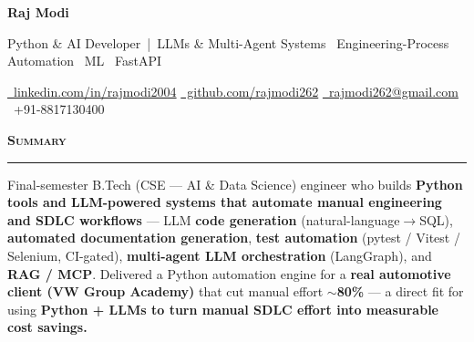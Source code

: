 \documentclass[a4paper,10pt]{article}
\newcommand{\sectionHeader}[2]{%
  \vspace{1.5pt}%
  \noindent%
  {\normalsize\bfseries\color{HeaderDark}#2\enspace\textsc{#1}}%
  \\[-6pt]%
  {\color{SectionLine}\rule{\textwidth}{1pt}}%
  \vspace{1pt}\par%
}
\begin{document}

\begin{center}
  {\fontsize{24}{28}\selectfont\bfseries\color{HeaderDark}Raj Modi}

  \vspace{2pt}

  {\small\color{MidGray}Python \& AI Developer \,|\, LLMs \& Multi-Agent Systems \textperiodcentered\ Engineering-Process Automation \textperiodcentered\ ML \textperiodcentered\ FastAPI}

  \vspace{3pt}

  {\small%
    \href{https://www.linkedin.com/in/rajmodi2004/}{{\color{AccentBlue}\faLinkedin}~\color{LinkBlue}linkedin.com/in/rajmodi2004}%
    \quad{\color{LightGray}|}%
    \quad\href{https://github.com/rajmodi262}{{\color{AccentBlue}\faGithub}~\color{LinkBlue}github.com/rajmodi262}%
    \quad{\color{LightGray}|}%
    \quad\href{mailto:rajmodi262@gmail.com}{{\color{AccentBlue}\faEnvelope}~\color{LinkBlue}rajmodi262@gmail.com}%
    \quad{\color{LightGray}|}%
    \quad{\color{AccentBlue}\faPhone*}~{\color{DarkGray}+91-8817130400}%
  }
\end{center}

\vspace{-2pt}


\sectionHeader{Summary}{\faUser}

\vspace{1pt}
{\small Final-semester B.Tech (CSE --- AI \& Data Science) engineer who builds \textbf{Python tools and LLM-powered systems that automate manual engineering and SDLC workflows} --- LLM \textbf{code generation} (natural-language$\rightarrow$SQL), \textbf{automated documentation generation}, \textbf{test automation} (pytest / Vitest / Selenium, CI-gated), \textbf{multi-agent LLM orchestration} (LangGraph), and \textbf{RAG / MCP}. Delivered a Python automation engine for a \textbf{real automotive client (VW Group Academy)} that cut manual effort \textbf{$\sim$80\%} --- a direct fit for using \textbf{Python + LLMs to turn manual SDLC effort into measurable cost savings.}}
\end{document}
